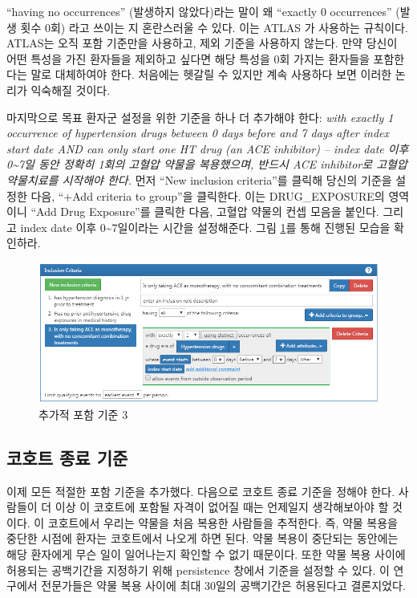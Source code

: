 \documentclass[11pt]{book}
\theoremstyle{definition}
\theoremstyle{definition}
\theoremstyle{definition}
\theoremstyle{remark}
\begin{document}
``having no occurrences'' (발생하지 않았다)라는 말이 왜 ``exactly 0
occurrences'' (발생 횟수 0회) 라고 쓰이는 지 혼란스러울 수 있다. 이는
ATLAS 가 사용하는 규칙이다. ATLAS는 오직 포함 기준만을 사용하고, 제외
기준을 사용하지 않는다. 만약 당신이 어떤 특성을 가진 환자들을 제외하고
싶다면 해당 특성을 0회 가지는 환자들을 포함한다는 말로 대체하여야 한다.
처음에는 헷갈릴 수 있지만 계속 사용하다 보면 이러한 논리가 익숙해질
것이다.

마지막으로 목표 환자군 설정을 위한 기준을 하나 더 추가해야 한다:
\emph{with exactly 1 occurrence of hypertension drugs between 0 days
before and 7 days after index start date AND can only start one HT drug
(an ACE inhibitor) -- index date 이후 0\textasciitilde{}7일 동안 정확히
1회의 고혈압 약물을 복용했으며, 반드시 ACE inhibitor로 고혈압 약물치료를
시작해야 한다.} 먼저 ``New inclusion criteria''를 클릭해 당신의 기준을
설정한 다음, ``+Add criteria to group''을 클릭한다. 이는
DRUG\_EXPOSURE의 영역이니 ``Add Drug Exposure''를 클릭한 다음, 고혈압
약물의 컨셉 모음을 붙인다. 그리고 index date 이후
0\textasciitilde{}7일이라는 시간을 설정해준다. 그림 \ref{fig:ATLASIC3}를
통해 진행된 모습을 확인하라.

\begin{figure}

{\centering \includegraphics[width=1\linewidth]{images/Cohorts/ATLAS-IC3} 

}

\caption{추가적 포함 기준 3}\label{fig:ATLASIC3}
\end{figure}

\subsection{코호트 종료 기준}\label{--}

이제 모든 적절한 포함 기준을 추가했다. 다음으로 코호트 종료 기준을
정해야 한다. 사람들이 더 이상 이 코호트에 포함될 자격이 없어질 때는
언제일지 생각해보아야 할 것이다. 이 코호트에서 우리는 약물을 처음 복용한
사람들을 추적한다. 즉, 약물 복용을 중단한 시점에 환자는 코호트에서
나오게 하면 된다. 약물 복용이 중단되는 동안에는 해당 환자에게 무슨 일이
일어나는지 확인할 수 없기 때문이다. 또한 약물 복용 사이에 허용되는
공백기간을 지정하기 위해 persistence 창에서 기준을 설정할 수 있다. 이
연구에서 전문가들은 약물 복용 사이에 최대 30일의 공백기간은 허용된다고
결론지었다.
\end{document}
